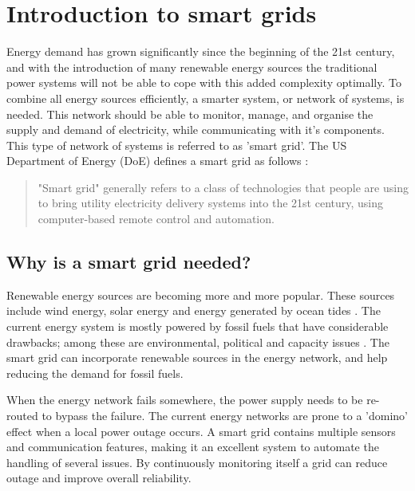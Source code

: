 \section{Introduction to smart grids}

Energy demand has grown significantly since the beginning of the 21st century, and with the introduction of many renewable energy sources the traditional power systems will not be able to cope with this added complexity optimally. To combine all energy sources efficiently, a smarter system, or network of systems, is needed. This network should be able to monitor, manage, and organise the supply and demand of electricity, while communicating with it's components. This type of network of systems is referred to as 'smart grid'. The US Department of Energy (DoE) defines a smart grid as follows \cite{doe}: 
\begin{quote}
"Smart grid" generally refers to a class of technologies that people are using to bring utility electricity delivery systems into the 21st century, using computer-based remote control and automation.
\end{quote}

\subsection{Why is a smart grid needed?}
Renewable energy sources are becoming more and more popular. These sources include wind energy, solar energy and energy generated by ocean tides \cite{Tromly2001}. The current energy system is mostly powered by fossil fuels that have considerable drawbacks; among these are environmental, political and capacity issues \cite{friedman2008hot}. The smart grid can incorporate renewable sources in the energy network, and help reducing the demand for fossil fuels.


When the energy network fails somewhere, the power supply needs to be re-routed to bypass the failure. The current energy networks are prone to a 'domino' effect when a local power outage occurs. A smart grid contains multiple sensors and communication features, making it an excellent system to automate the handling of several issues. By continuously monitoring itself a grid can reduce outage and improve overall reliability.

